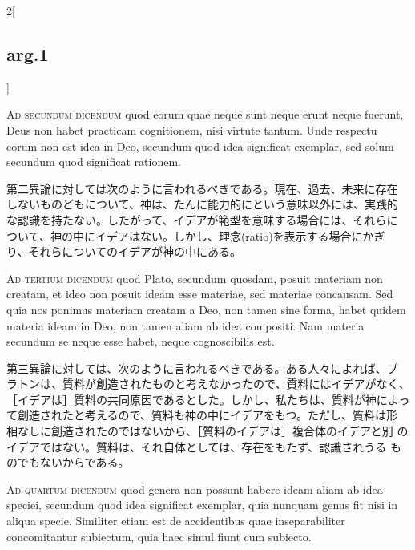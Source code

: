 \documentclass[paper=a4paper,fontsize=10pt,jafontsize=9pt,titlepage]{jlreq}
\begin{document}
\begin{paracol}{2}[\subsection{arg.1}]
\switchcolumn*[\subsection{ad.2}]

{\scshape Ad secundum dicendum} quod eorum quae neque sunt neque erunt
neque fuerunt, Deus non habet practicam cognitionem, nisi virtute
tantum. Unde respectu eorum non est idea in Deo, secundum quod idea
significat exemplar, sed solum secundum quod significat rationem.

\switchcolumn

第二異論に対しては次のように言われるべきである。現在、過去、未来に存在
しないものどもについて、神は、たんに能力的にという意味以外には、実践的
な認識を持たない。したがって、イデアが範型を意味する場合には、それらに
ついて、神の中にイデアはない。しかし、理念(ratio)を表示する場合にかぎ
り、それらについてのイデアが神の中にある。

\switchcolumn*[\subsection{ad.3}]

{\scshape Ad tertium dicendum} quod Plato, secundum quosdam, posuit
materiam non creatam, et ideo non posuit ideam esse materiae, sed
materiae concausam. Sed quia nos ponimus materiam creatam a Deo, non
tamen sine forma, habet quidem materia ideam in Deo, non tamen aliam
ab idea compositi. Nam materia secundum se neque esse habet, neque
cognoscibilis est.

\switchcolumn

第三異論に対しては、次のように言われるべきである。ある人々によれば、プ
ラトンは、質料が創造されたものと考えなかったので、質料にはイデアがなく、
［イデアは］質料の共同原因であるとした。しかし、私たちは、質料が神によっ
て創造されたと考えるので、質料も神の中にイデアをもつ。ただし、質料は形
相なしに創造されたのではないから、［質料のイデアは］複合体のイデアと別
のイデアではない。質料は、それ自体としては、存在をもたず、認識されうる
ものでもないからである。

\switchcolumn*[\subsection{ad.4}]

{\scshape Ad quartum dicendum} quod genera non possunt habere ideam
aliam ab idea speciei, secundum quod idea significat exemplar, quia
nunquam genus fit nisi in aliqua specie. Similiter etiam est de
accidentibus quae inseparabiliter concomitantur subiectum, quia haec
simul fiunt cum subiecto.


\end{paracol}
\end{document}
